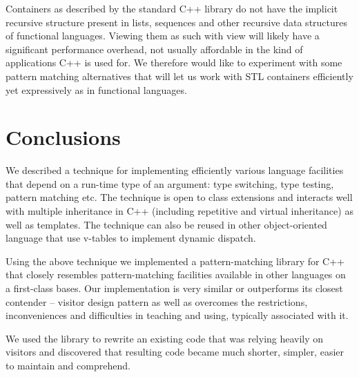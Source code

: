 \documentclass[preprint]{sigplanconf}
\begin{document}
Containers as described by the standard C++ library do not have the implicit 
recursive structure present in lists, sequences and other recursive data 
structures of functional languages. Viewing them as such with view will likely 
have a significant performance overhead, not usually affordable in the kind of 
applications C++ is used for. We therefore would like to experiment with some 
pattern matching alternatives that will let us work with STL containers 
efficiently yet expressively as in functional languages.


\section{Conclusions} %
\label{sec:cc}

We described a technique for implementing efficiently various language 
facilities that depend on a run-time type of an argument: type switching, type 
testing, pattern matching etc. The technique is open to class extensions and 
interacts well with multiple inheritance in C++ (including repetitive and 
virtual inheritance) as well as templates. The technique can also be reused in 
other object-oriented language that use v-tables to implement dynamic dispatch.

Using the above technique we implemented a pattern-matching library for C++ that 
closely resembles pattern-matching facilities available in other languages on a 
first-class bases. Our implementation is very similar or outperforms its closest 
contender -- visitor design pattern as well as overcomes the restrictions, 
inconveniences and difficulties in teaching and using, typically associated with 
it.

We used the library to rewrite an existing code that was relying heavily on 
visitors and discovered that resulting code became much shorter, simpler, easier 
to maintain and comprehend.
\end{document}
